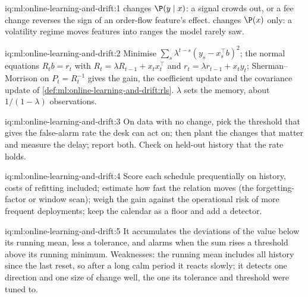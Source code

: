 \begin{solution}{iq:ml:online-learning-and-drift:1}
 changes $\P(y\mid x)$: a signal crowds out, or a fee change reverses the sign of an order-flow feature's
effect.  changes $\P(x)$ only: a volatility regime moves features into ranges the model rarely saw.
\end{solution}

\begin{solution}{iq:ml:online-learning-and-drift:2}
Minimise $\sum_s\lambda^{t-s}(y_s - x_s^\top b)^2$; the normal equations $R_tb = r_t$ with $R_t = \lambda R_{t-1} + x_tx_t^\top$
and $r_t = \lambda r_{t-1} + x_ty_t$; Sherman--Morrison on $P_t = R_t^{-1}$ gives the gain, the coefficient update and the
covariance update of \cref{def:ml:online-learning-and-drift:rls}. $\lambda$ sets the memory, about $1/(1-\lambda)$
observations.
\end{solution}

\begin{solution}{iq:ml:online-learning-and-drift:3}
On data with no change, pick the threshold that gives the false-alarm rate the desk can act on; then plant the changes that
matter and measure the delay; report both. Check on held-out history that the rate holds.
\end{solution}

\begin{solution}{iq:ml:online-learning-and-drift:4}
Score each schedule prequentially on history, costs of refitting included; estimate how fast the relation moves (the
forgetting-factor or window scan); weigh the gain against the operational risk of more frequent deployments; keep the
calendar as a floor and add a detector.
\end{solution}

\begin{solution}{iq:ml:online-learning-and-drift:5}
It accumulates the deviations of the value below its running mean, less a tolerance, and alarms when the sum rises a
threshold above its running minimum. Weaknesses: the running mean includes all history since the last reset, so after a
long calm period it reacts slowly; it detects one direction and one size of change well, the one its tolerance and
threshold were tuned to.
\end{solution}

